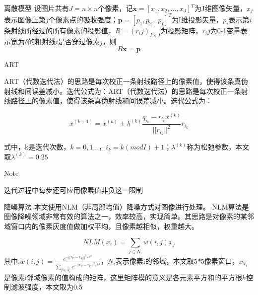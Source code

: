 \documentclass{beamer}
\begin{document}
  
  
\begin{frame}{离散模型}  
	设图片共有\(J = n\times n\)个像素，记$\textbf{x}=[x_{1},x_{2} ,\ldots ,x_{J}]^T$为J维图像矢量，\(x_j\)表示图像上第\(j\)个像素点的吸收强度；$\textbf{p}=[p_{1},p_{2} \ldots p_{I}]^T$为I维投影矢量，$p_i$表示第\(i\)条射线所经过的所有像素的投影值，$R=(r_ij)_{I\times J}$为投影矩阵，\(r_ij\)为0-1变量表示宽为\(\delta\)的粗射线\(i\)是否穿过像素\(j\)，则	  
	\begin{equation}
		R\textbf{x}=\textbf{p}
	\end{equation}
\end{frame}
  
  
  
\begin{frame}{ART}
	  
	ART（代数迭代法）的思路是每次校正一条射线路径上的像素值，使得该条真伪射线和间误差减小。迭代公式为：ART（代数迭代法）的思路是每次校正一条射线路径上的像素值，使得该条真伪射线和间误差减小。迭代公式为：
	  
	\begin{equation}
		x^{(k+1)}=x^{(k)}+\lambda^{(k)}\frac{q_{i_{k}}-r_{i_{k}}x^{(k)}}{||r_{i_{k}}||^{2}}r_{i_{k}}
	\end{equation}
	  
	式中，k是迭代次数，$k=0,1 \ldots$，$i_{k}=k(modI)+1$；$\lambda^{(k)}$称为松弛参数，本文取$\lambda^{(k)}=0.25$
	  
	\begin{alertblock}{Note}
		  
		迭代过程中每步还可应用像素值非负这一限制
		  
	\end{alertblock}
	  
\end{frame}
  
  
  
\begin{frame}{降噪算法}
	本文使用NLM（非局部均值）降噪方式对图像进行处理。 NLM算法是图像降噪领域非常有效的算法之一，效率较高，实现简单。其思路是对像素的某邻域窗口内的像素灰度值做加权平均，且像素越相似，权重越大。
	  
	\begin{equation}
		NLM(x_{i})=\sum_{j\in N_{i}} w(i,j)x_{j}
	\end{equation}
	其中,\(w(i,j)=\frac{e^{-||x_{V_{i}}-x_{V_{j}}||^2/h^2}}{\sum_{j\in N_{i}}e^{-||x_{V_{i}}-x_{V_{j}}||^2/h^2}}\)，$N_{i}$表示像素i的邻域，本文取5*5像素窗口，$x_{V_{i}}$是像素i邻域像素的值构成的矩阵，这里矩阵模的意义是各元素平方和的平方根$h$控制滤波强度，本文取为0.5
\end{frame}
  
\end{document}

